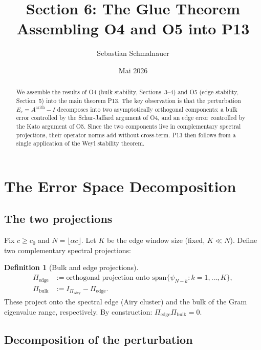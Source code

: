 \documentclass[12pt,a4paper]{amsart}
\title{Section 6: The Glue Theorem\\
{\normalsize Assembling O4 and O5 into P13}}
\author{Sebastian Schmalnauer}
\date{Mai 2026}
\theoremstyle{definition}
\newtheorem{definition}[theorem]{Definition}
\newcommand{\PAi}{\Pi_{\mathrm{Airy}}}
\newcommand{\Pbulk}{\Pi_{\mathrm{bulk}}}
\newcommand{\Pedge}{\Pi_{\mathrm{edge}}}
\newcommand{\Aarith}{A^{\mathrm{arith}}}
\newcommand{\Ec}{E_c}
\begin{document}
\maketitle

\begin{abstract}
We assemble the results of O4 (bulk stability, Sections~3--4)
and O5 (edge stability, Section~5) into the main theorem P13.
The key observation is that the perturbation $\Ec = \Aarith - I$
decomposes into two asymptotically orthogonal components:
a bulk error controlled by the Schur-Jaffard argument of O4,
and an edge error controlled by the Kato argument of O5.
Since the two components live in complementary spectral projections,
their operator norms add without cross-term.
P13 then follows from a single application of the Weyl stability theorem.
\end{abstract}

\section{The Error Space Decomposition}
\label{sec:decomp}

\subsection{The two projections}

Fix $c \ge c_0$ and $N = \lfloor \alpha c \rfloor$.
Let $K$ be the edge window size (fixed, $K \ll N$).
Define two complementary spectral projections:

\begin{definition}[Bulk and edge projections]
\begin{align*}
  \Pedge &:= \text{orthogonal projection onto }
    \mathrm{span}\{\psi_{N-k} : k = 1,\ldots,K\}, \\
  \Pbulk &:= I_{\PAi} - \Pedge.
\end{align*}
These project onto the spectral edge (Airy cluster) and the
bulk of the Gram eigenvalue range, respectively.
By construction: $\Pedge \Pbulk = 0$.
\end{definition}

\subsection{Decomposition of the perturbation}
\end{document}
